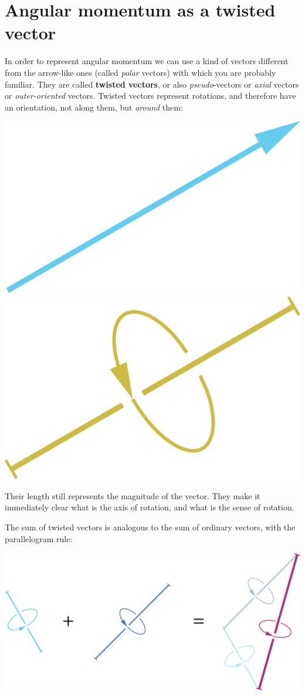 \documentclass[a4paper,12pt,%
onecolumn,oneside,%
british%
]{memoir}
\renewcommand*{\|}[1][]{\nonscript\:#1\vert\nonscript\:\mathopen{}}
\begin{document}
\section{Angular momentum as a twisted vector}
\label{sec:twisted_vec}

In order to represent angular momentum we can use a kind of vectors different from the arrow-like ones (called \emph{polar} vectors) with which you are probably familiar. They are called \textbf{twisted vectors}, or also \emph{pseudo}-vectors or \emph{axial} vectors or \emph{outer-oriented} vectors. Twisted vectors represent rotations, and therefore have an orientation, not along them, but \emph{around} them:
\begin{center}
\includegraphics[width=0.34\linewidth]{images/io-vector.pdf}%
\hspace*{0.12\linewidth}\includegraphics[width=0.34\linewidth]{images/oo-vector.pdf}%
%
\\\footnotesize
{}\hspace*{0.46\linewidth}
\end{center}
Their length still represents the magnitude of the vector. They make it immediately clear what is the axis of rotation, and what is the sense of rotation.

The sum of twisted vectors is analogous to the sum of ordinary vectors, with the parallelogram rule:
\begin{center}
\includegraphics[width=0.67\linewidth]{images/tvectorsum.pdf}%
\end{center}
\end{document}
